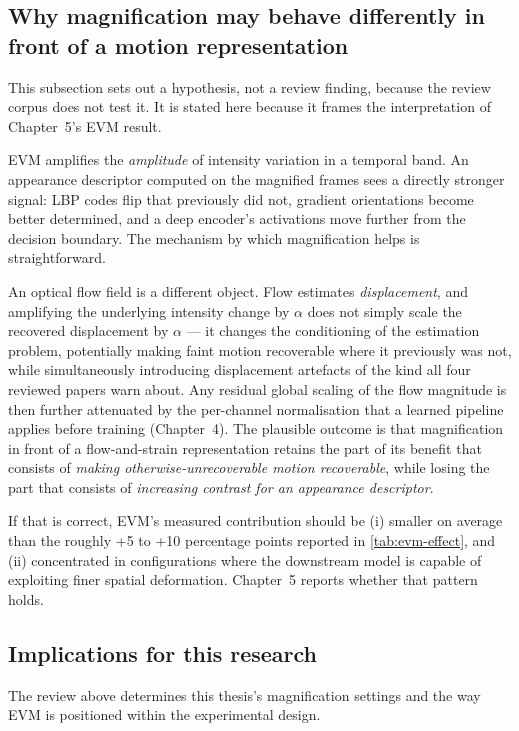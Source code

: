\subsection{Why magnification may behave differently in front of a motion representation}
\label{sec:evm-motion-hypothesis}

This subsection sets out a hypothesis, not a review finding, because the review corpus does not test it. It is stated here because it frames the interpretation of Chapter~5's EVM result.

EVM amplifies the \textit{amplitude} of intensity variation in a temporal band. An appearance descriptor computed on the magnified frames sees a directly stronger signal: LBP codes flip that previously did not, gradient orientations become better determined, and a deep encoder's activations move further from the decision boundary. The mechanism by which magnification helps is straightforward.

An optical flow field is a different object. Flow estimates \textit{displacement}, and amplifying the underlying intensity change by $\alpha$ does not simply scale the recovered displacement by $\alpha$ --- it changes the conditioning of the estimation problem, potentially making faint motion recoverable where it previously was not, while simultaneously introducing displacement artefacts of the kind all four reviewed papers warn about. Any residual global scaling of the flow magnitude is then further attenuated by the per-channel normalisation that a learned pipeline applies before training (Chapter~4). The plausible outcome is that magnification in front of a flow-and-strain representation retains the part of its benefit that consists of \textit{making otherwise-unrecoverable motion recoverable}, while losing the part that consists of \textit{increasing contrast for an appearance descriptor}.

If that is correct, EVM's measured contribution should be (i) smaller on average than the roughly +5 to +10 percentage points reported in \autoref{tab:evm-effect}, and (ii) concentrated in configurations where the downstream model is capable of exploiting finer spatial deformation. Chapter~5 reports whether that pattern holds.

\subsection{Implications for this research}
\label{sec:evm-implications}

The review above determines this thesis's magnification settings and the way EVM is positioned within the experimental design.

